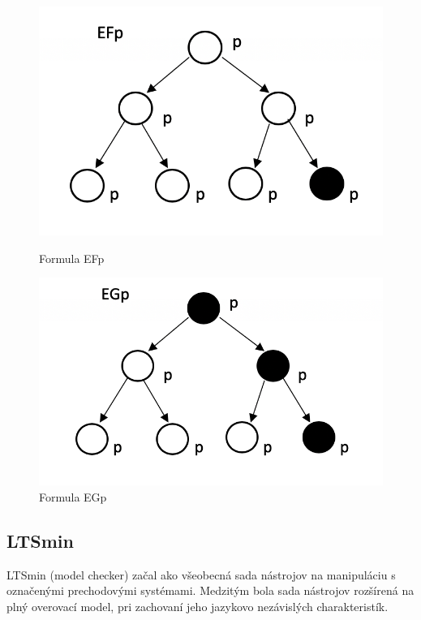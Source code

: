 \begin{figure}[H]
	\centering
	\begin{minipage}{.5\textwidth}
	  \centering
	  \includegraphics[width=1\linewidth]{images/EF}
	  \caption[Formula EFp]{Formula EFp}
	  \label{obr:EF}
	\end{minipage}%
	\begin{minipage}{.5\textwidth}
	  \centering
	  \includegraphics[width=1.1\linewidth]{images/EG}
	  \caption[Formula EGp]{Formula EGp}
	  \label{obr:EG}
	\end{minipage}
\end{figure}


\subsection{LTSmin}
LTSmin (model checker) začal ako všeobecná sada nástrojov na manipuláciu s označenými prechodovými systémami. 
Medzitým bola sada nástrojov rozšírená na plný overovací model, 
pri zachovaní jeho jazykovo nezávislých charakteristík.


